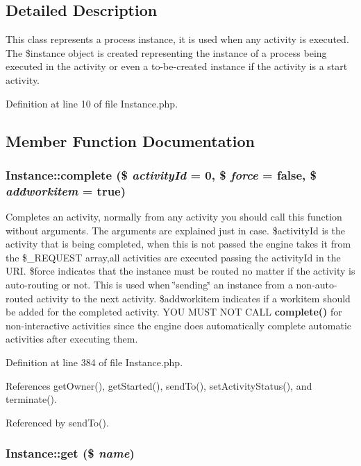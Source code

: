 \subsection{Detailed Description}
This class represents a process instance, it is used when any activity is executed. The \$instance object is created representing the instance of a process being executed in the activity or even a to-be-created instance if the activity is a start activity. 



Definition at line 10 of file Instance.php.

\subsection{Member Function Documentation}
\subsubsection{\setlength{\rightskip}{0pt plus 5cm}Instance::complete (\$ {\em activity\-Id} = 0, \$ {\em force} = false, \$ {\em addworkitem} = true)}\label{classInstance_a23}


Completes an activity, normally from any activity you should call this function without arguments. The arguments are explained just in case. \$activity\-Id is the activity that is being completed, when this is not passed the engine takes it from the \$\_\-REQUEST array,all activities are executed passing the activity\-Id in the URI. \$force indicates that the instance must be routed no matter if the activity is auto-routing or not. This is used when \char`\"{}sending\char`\"{} an instance from a non-auto-routed activity to the next activity. \$addworkitem indicates if a workitem should be added for the completed activity. YOU MUST NOT CALL {\bf complete()} for non-interactive activities since the engine does automatically complete automatic activities after executing them. 

Definition at line 384 of file Instance.php.

References get\-Owner(), get\-Started(), send\-To(), set\-Activity\-Status(), and terminate().

Referenced by send\-To().
\subsubsection{\setlength{\rightskip}{0pt plus 5cm}Instance::get (\$ {\em name})}\label{classInstance_a5}


